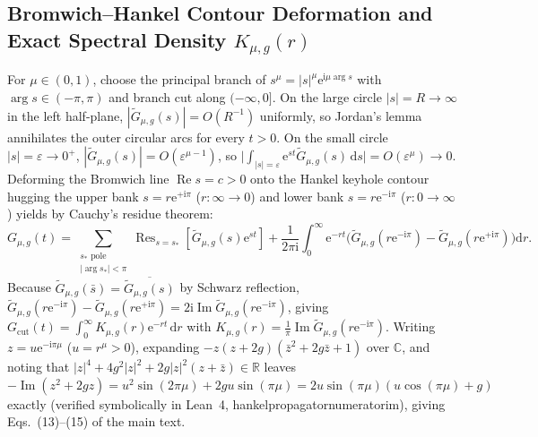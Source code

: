 \documentclass[onecolumn,10pt,notitlepage,amsmath,amssymb,floatfix]{revtex4-2}
\theoremstyle{plain}
\theoremstyle{definition}
\newcommand{\dd}{\mathrm{d}}
\newcommand{\ii}{\mathrm{i}}
\newcommand{\ee}{\mathrm{e}}
\newcommand{\leanid}[1]{{\footnotesize\ttfamily\def\_{\textunderscore\penalty0\hspace{0pt}}#1}}
\begin{document}
\subsection{Bromwich--Hankel Contour Deformation and Exact Spectral Density \texorpdfstring{$K_{\mu,g}(r)$}{K\_\{mu,g\}(r)}}

For $\mu \in (0,1)$, choose the principal branch of $s^\mu = |s|^\mu \ee^{\ii\mu\arg s}$ with $\arg s \in (-\pi, \pi)$ and branch cut along $(-\infty, 0]$. On the large circle $|s| = R \to \infty$ in the left half-plane, $|\tilde{G}_{\mu,g}(s)| = O(R^{-1})$ uniformly, so Jordan's lemma annihilates the outer circular arcs for every $t > 0$. On the small circle $|s| = \varepsilon \to 0^+$, $|\tilde{G}_{\mu,g}(s)| = O(\varepsilon^{\mu-1})$, so $\big|\int_{|s|=\varepsilon} \ee^{st}\tilde{G}_{\mu,g}(s)\,\dd s\big| = O(\varepsilon^\mu) \to 0$. Deforming the Bromwich line $\operatorname{Re} s = c > 0$ onto the Hankel keyhole contour hugging the upper bank $s = r\ee^{+\ii\pi}$ ($r:\infty\to 0$) and lower bank $s = r\ee^{-\ii\pi}$ ($r:0\to\infty$) yields by Cauchy's residue theorem:
\begin{equation}
\label{eq:S2_keyhole}
G_{\mu,g}(t) = \sum_{\substack{s_* \text{ pole}\\|\arg s_*| < \pi}} \operatorname{Res}_{s=s_*}\!\left[\tilde{G}_{\mu,g}(s)\ee^{st}\right]
+ \frac{1}{2\pi\ii}\int_0^\infty \ee^{-rt}\Big(\tilde{G}_{\mu,g}(r\ee^{-\ii\pi}) - \tilde{G}_{\mu,g}(r\ee^{+\ii\pi})\Big)\dd r.
\end{equation}
Because $\tilde{G}_{\mu,g}(\bar{s}) = \overline{\tilde{G}_{\mu,g}(s)}$ by Schwarz reflection, $\tilde{G}_{\mu,g}(r\ee^{-\ii\pi}) - \tilde{G}_{\mu,g}(r\ee^{+\ii\pi}) = 2\ii\operatorname{Im}\tilde{G}_{\mu,g}(r\ee^{-\ii\pi})$, giving $G_{\mathrm{cut}}(t) = \int_0^\infty K_{\mu,g}(r)\ee^{-rt}\,\dd r$ with $K_{\mu,g}(r) = \frac{1}{\pi}\operatorname{Im}\tilde{G}_{\mu,g}(r\ee^{-\ii\pi})$. Writing $z = u\ee^{-\ii\pi\mu}$ ($u = r^\mu > 0$), expanding $-z(z+2g)(\bar{z}^2+2g\bar{z}+1)$ over $\mathbb{C}$, and noting that $|z|^4 + 4g^2|z|^2 + 2g|z|^2(z+\bar{z}) \in \mathbb{R}$ leaves $-\operatorname{Im}(z^2+2gz) = u^2\sin(2\pi\mu) + 2gu\sin(\pi\mu) = 2u\sin(\pi\mu)(u\cos(\pi\mu)+g)$ exactly (verified symbolically in Lean~4, \leanid{hankel\_propagator\_numerator\_im}), giving Eqs.~(13)--(15) of the main text.
\end{document}
